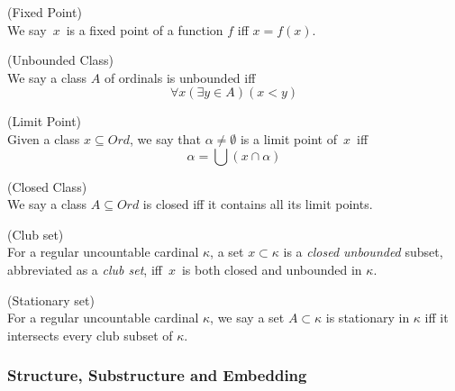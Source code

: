 \begin{definition}{(Fixed Point)}\label{def:fixed_point}\\
We say~$x$~is a fixed point of a function $f$ iff $x=f(x)$.
\end{definition}

\begin{definition}{(Unbounded Class)}\label{def:unbounded_class}\\
We say a class $A$ of ordinals is unbounded iff
\begin{equation}
\forall x (\exists y \in A) (x < y)
\end{equation}
\end{definition}

\begin{definition}{(Limit Point)}\label{def:limit_point}\\
Given a class $x \subseteq Ord$, we say that $\alpha \neq \emptyset$ is a limit point of~$x$~iff 
\begin{equation}
\alpha = \bigcup(x \cap \alpha)
\end{equation}
\end{definition}

\begin{definition}{(Closed Class)}\label{def:closed_class}\\
We say a class $A \subseteq Ord$ is closed iff it contains all its limit points.
\end{definition}

\begin{definition}{(Club set)}\label{def:club_set}\\
For a regular uncountable cardinal $\kappa$, a set $x \subset \kappa$ is a \emph{closed unbounded} subset, abbreviated as a \emph{club set}, iff~$x$~is both closed and unbounded in $\kappa$.
\end{definition}

\begin{definition}{(Stationary set)}\label{def:stationary_set}\\
For a regular uncountable cardinal $\kappa$, we say a set $A \subset \kappa$ is stationary in $\kappa$ iff it intersects every club subset of $\kappa$.
\end{definition}

\subsubsection{Structure, Substructure and Embedding}

